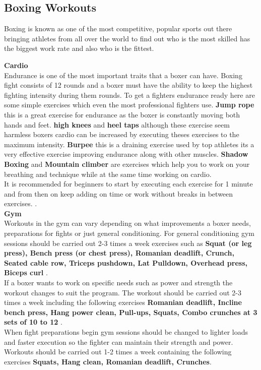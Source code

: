 \documentclass[a4paper,12pt]{report}
\begin{document}
\subsection{Boxing Workouts}
Boxing is known as one of the most competitive, popular sports out there bringing athletes from all over the world to find out who is the most skilled has the biggest work rate and also who is the fittest.

\textbf{Cardio}\\
Endurance is one of the most important traits that a boxer can have. Boxing fight consists of 12 rounds and a boxer must have the ability to keep the highest fighting intensity during them rounds.
To get  a fighters endurance ready here are some simple exercises which even the most professional fighters use.
\textbf{Jump rope} this is a great exercise for endurance as the boxer is constantly moving both hands and feet. \textbf{high knees} and \textbf{heel taps} although these exercise seem harmless boxers cardio can be increased by executing theses exercises to the maximum intensity. \textbf{Burpee} this is a draining exercise used by top athletes its a very effective exercise improving endurance along with other muscles. \textbf{Shadow Boxing} and \textbf{Mountain climber} are exercises which help you to work on your breathing and technique while at the same time working on cardio.\\
It is recommended for beginners to start by executing each exercise for 1 minute and from then on keep adding on time or work without breaks in between exercises. \cite{cardioWorkout}.\\

\textbf{Gym}\\
Workouts in the gym can vary depending on what improvements a boxer needs, preparations for fights or just general conditioning.
For general conditioning gym sessions should be carried out 2-3 times a week exercises such as 
   \textbf{Squat (or leg press), Bench press (or chest press), Romanian deadlift, Crunch, Seated cable row, Triceps pushdown, Lat Pulldown, Overhead press, Biceps curl
 }.\\
If a boxer wants to work on specific needs such as power and strength the workout changes to suit the program.
The workout should be carried out 2-3 times a week including the following exercises \textbf{Romanian deadlift, Incline bench press, Hang power clean, Pull-ups, Squats, Combo crunches at 3 sets of 10 to 12
}.\\
When fight preparations begin gym sessions should be changed to lighter loads and faster execution so the fighter can maintain their strength and power.
Workouts should be carried out 1-2 times a week containing the following exercises \textbf{Squats, Hang clean, Romanian deadlift, Crunches}.\cite{gymWorkout}\\
\end{document}
